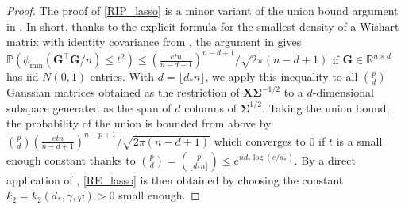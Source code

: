 \documentclass[11pt]{amsart}
\numberwithin{equation}{section}
\numberwithin{equation}{section}
\def\real{{\mathbb{R}}}
\def\R{{\real}}
\def\P{{\mathbb{P}}}
\def\mathbold{\boldsymbol} %
\def\bG{\mathbold{G}}\def\calG{{\cal G}}\def\scrG{{\mathscr G}}\def\Ghat{\widehat{G}}\def\Gtil{{\widetilde G}}
\def\bX{\mathbold{X}}\def\hbX{{\widehat{\bX}}}\def\tbX{{\widetilde{\bX}}}\def\bXbar{{\overline \bX}}
\def\bSigma{\mathbold{\Sigma}}\def\hbSigma{{\widehat{\bSigma}}}
\def\calG{{\cal G}}
\begin{document}
\begin{proof}
    The proof of \eqref{RIP_lasso} is a minor variant of the union bound argument
    in \cite[Proposition 2.10]{blanchard2011compressed}. In short, thanks to
    the explicit formula for the smallest density of a Wishart matrix
    with identity covariance from \cite{edelman1988eigenvalues},
    the argument in \cite[Proof of Lemma 4.1]{chen2005condition} gives
    $\P(\phi_{\min}(\bG^\top\bG/n)
    \le t^2 )
    \le (\frac{etn}{n-d+1})^{n-d+1} / \sqrt{2\pi(n-d+1)}$
    if $\bG\in\R^{n\times d}$ has iid $N(0,1)$ entries.
    With $d=\lfloor d_* n\rfloor$,
    we apply this inequality to all $\binom{p}{d}$
    Gaussian matrices obtained as the restriction of
    $\bX\bSigma^{-1/2}$ to a $d$-dimensional subspace
    generated as the span of $d$ columns of
    $\bSigma^{1/2}$.
    Taking the union bound, the probability of the union
    is bounded from above by
    $\binom{p}{d}(\frac{etn}{n-d+1})^{n-p+1} / \sqrt{2\pi(n-d+1)}$
    which converges to 0 if $t$ is a small enough constant
    thanks to $\binom{p}{d}=\binom{p}{\lfloor d_*n\rfloor}\le e^{n d_*\log(e/d_*)}$.
    By a direct application of \cite[Lemma 2.7]{lecue2014sparse},
    \eqref{RE_lasso} is then obtained by choosing the constant $k_2=k_2(d_*,\gamma,\varphi)>0$
    small enough.


\end{proof}
\end{document}

